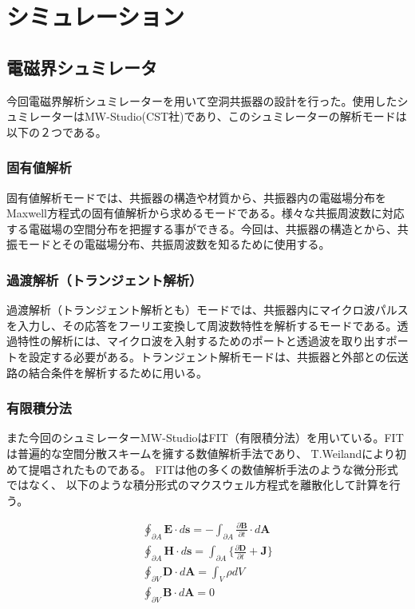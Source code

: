 \chapter{シミュレーション}

\section{電磁界シュミレータ}
今回電磁界解析シュミレーターを用いて空洞共振器の設計を行った。使用したシュミレーターはMW-Studio(CST社)\cite{CST}であり、このシュミレーターの解析モードは以下の２つである。\cite{MWS-1}

\subsection{固有値解析}
固有値解析モードでは、共振器の構造や材質から、共振器内の電磁場分布をMaxwell方程式の固有値解析から求めるモードである。様々な共振周波数に対応する電磁場の空間分布を把握する事ができる。今回は、共振器の構造とから、共振モードとその電磁場分布、共振周波数を知るために使用する。

\subsection{過渡解析（トランジェント解析）}
過渡解析（トランジェント解析とも）モードでは、共振器内にマイクロ波パルスを入力し、その応答をフーリエ変換して周波数特性を解析するモードである。透過特性の解析には、マイクロ波を入射するためのポートと透過波を取り出すポートを設定する必要がある。トランジェント解析モードは、共振器と外部との伝送路の結合条件を解析するために用いる。

\subsection{有限積分法}
また今回のシュミレーターMW-StudioはFIT（有限積分法）を用いている。\cite{MWS-2}FITは普遍的な空間分散スキームを擁する数値解析手法であり、
T.Weilandにより初めて提唱された\cite{FIT}ものである。
FITは他の多くの数値解析手法のような微分形式ではなく、
以下のような積分形式のマクスウェル方程式を離散化して計算を行う。

\begin{eqnarray}
  \oint_{\partial A} \mathbf{E} \cdot d\mathbf{s}
  = - \int_{\partial A} \frac{\partial \mathbf{B}}{\partial t} \cdot d  \mathbf{A}\\
  \oint_{\partial A} \mathbf{H} \cdot d\mathbf{s} =  \int_{\partial A} \{ \frac{\partial \mathbf{D}}{\partial t} + \mathbf{J} \} \\
  \oint_{\partial V} \mathbf{D} \cdot d\mathbf{A} = \int_V \rho dV \\
  \oint_{\partial V} \mathbf{B} \cdot d\mathbf{A} = 0
\end{eqnarray}

